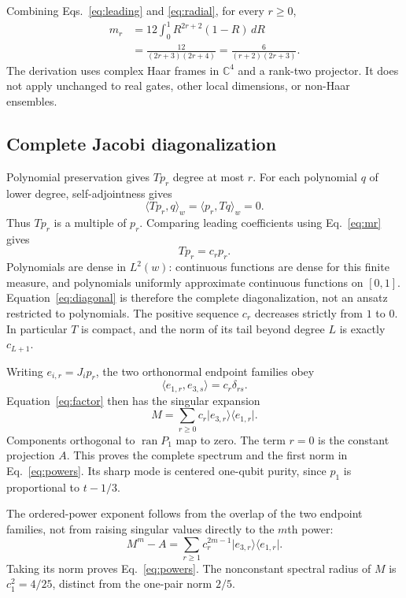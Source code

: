 \documentclass[aps,pra,reprint,amsmath,amssymb,longbibliography]{revtex4-2}
\newcommand{\C}{\mathbb C}
\newcommand{\ran}{\operatorname{ran}}
\newcommand{\ket}[1]{\lvert #1\rangle}
\newcommand{\bra}[1]{\langle #1\rvert}
\begin{document}
Combining Eqs.~\eqref{eq:leading} and \eqref{eq:radial}, for every $r\geq0$,
\begin{align}
 m_r&=12\int_0^1 R^{2r+2}(1-R)\,dR\nonumber\\
    &=\frac{12}{(2r+3)(2r+4)}
     =\frac{6}{(r+2)(2r+3)}.
\label{eq:mr}
\end{align}
The derivation uses complex Haar frames in $\C^4$ and a rank-two projector. It does not apply unchanged to real gates, other local dimensions, or non-Haar ensembles.

\subsection{Complete Jacobi diagonalization}

Polynomial preservation gives $Tp_r$ degree at most $r$. For each polynomial $q$ of lower degree, self-adjointness gives
\begin{equation}
 \langle Tp_r,q\rangle_w=\langle p_r,Tq\rangle_w=0.
\end{equation}
Thus $Tp_r$ is a multiple of $p_r$. Comparing leading coefficients using Eq.~\eqref{eq:mr} gives
\begin{equation}
 Tp_r=c_rp_r.
\label{eq:diagonal}
\end{equation}
Polynomials are dense in $L^2(w)$: continuous functions are dense for this finite measure, and polynomials uniformly approximate continuous functions on $[0,1]$. Equation~\eqref{eq:diagonal} is therefore the complete diagonalization, not an ansatz restricted to polynomials. The positive sequence $c_r$ decreases strictly from $1$ to $0$. In particular $T$ is compact, and the norm of its tail beyond degree $L$ is exactly $c_{L+1}$.

Writing $e_{i,r}=J_ip_r$, the two orthonormal endpoint families obey
\begin{equation}
 \langle e_{1,r},e_{3,s}\rangle=c_r\delta_{rs}.
\end{equation}
Equation~\eqref{eq:factor} then has the singular expansion
\begin{equation}
 M=\sum_{r\geq0}c_r\ket{e_{3,r}}\bra{e_{1,r}}.
\label{eq:svd}
\end{equation}
Components orthogonal to $\ran P_1$ map to zero. The term $r=0$ is the constant projection $A$. This proves the complete spectrum and the first norm in Eq.~\eqref{eq:powers}. Its sharp mode is centered one-qubit purity, since $p_1$ is proportional to $t-1/3$.

The ordered-power exponent follows from the overlap of the two endpoint families, not from raising singular values directly to the $m$th power:
\begin{equation}
 M^m-A=\sum_{r\geq1}c_r^{2m-1}
              \ket{e_{3,r}}\bra{e_{1,r}}.
\label{eq:mpower}
\end{equation}
Taking its norm proves Eq.~\eqref{eq:powers}. The nonconstant spectral radius of $M$ is $c_1^2=4/25$, distinct from the one-pair norm $2/5$.
\end{document}
